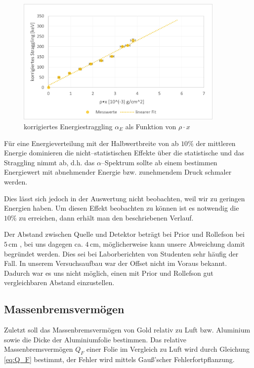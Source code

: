 \documentclass[12pt,a4paper]{scrartcl}
\numberwithin{equation}{section} %
\begin{document}
\begin{figure}[h]
	\centering
	\includegraphics[width=0.9\textwidth]{../media/B3.3/Straggling corrected.jpg}
	\caption{korrigiertes Energiestraggling $\alpha _E$ als Funktion von $\rho \cdot x$}
	\label{abb:korr. Straggling}
\end{figure}

Für eine Energieverteilung mit der Halbwertbreite von ab $10\%$ der mittleren Energie dominieren die nicht--statistischen Effekte über die statistische und das Straggling nimmt ab, d.h. das $\alpha$--Spektrum sollte ab einem bestimmen Energiewert mit abnehmender Energie bzw. zunehmendem Druck schmaler werden.

Dies lässt sich jedoch in der Auswertung nicht beobachten, weil wir zu geringen Energien haben. Um diesen Effekt beobachten zu können ist es notwendig die $10\%$ zu erreichen, dann erhält man den beschriebenen Verlauf.

Der Abstand zwischen Quelle und Detektor beträgt bei Prior und Rollefson bei $5\mathrm{\,cm}$  \cite{Prior}, bei uns dagegen ca. $4\mathrm{\,cm}$, möglicherweise kann unsere Abweichung damit begründet werden. Dies sei bei Laborberichten von Studenten sehr häufig der Fall. \cite{Prior} In unserem Versuchsaufbau war der Offset nicht im Voraus bekannt. Dadurch war es uns nicht möglich, einen mit Prior und Rollefson gut vergleichbaren Abstand einzustellen.

\hypertarget{massenbremsvermuxf6gen}{%
\subsection{Massenbremsvermögen}\label{massenbremsvermuxf6gen}}

Zuletzt soll das Massenbremsvermögen von Gold relativ zu Luft bzw. Aluminium sowie die Dicke der Aluminiumfolie bestimmen. Das relative Massenbremsvermögen $Q_F$ einer Folie im Vergleich zu Luft wird durch Gleichung \eqref{eq:Q_F} bestimmt, der Fehler wird mittels Gauß'scher Fehlerfortpflanzung.
\end{document}
